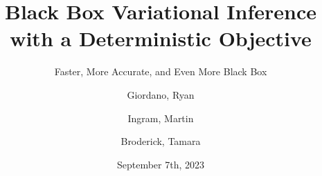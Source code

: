 \documentclass[8pt]{beamer}\usepackage[]{graphicx}\usepackage[]{color}
\begin{document}

\title{Black Box Variational Inference\\\hspace{1em}with a Deterministic Objective}

\subtitle{Faster, More Accurate, and Even More Black Box} 
\date{September 7th, 2023}

\author{Giordano, Ryan  \and Ingram, Martin \and Broderick, Tamara}



\frame{\titlepage}

\end{document}

